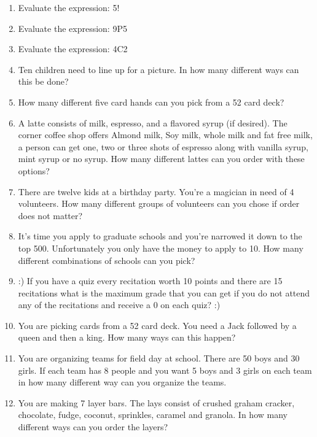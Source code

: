 \documentclass[12pt]{article}
\begin{document}
\begin{enumerate}

\item Evaluate the expression:  5!

\item Evaluate the expression: 9P5

\item Evaluate the expression: 4C2

\item Ten children need to line up for a picture. In how many different ways can this be done?

\item How many different five card hands can you pick from a 52 card deck?

\item A latte consists of milk, espresso, and a flavored syrup (if desired). The corner coffee shop offers Almond milk, Soy milk, whole milk and fat free milk, a person can get one, two or three shots of espresso along with vanilla syrup, mint syrup or no syrup. How many different lattes can you order with these options?

\item There are twelve kids at a birthday party. You're a magician in need of 4 volunteers. How many different groups of volunteers can you chose if order does not matter?

\item It's time you apply to graduate schools and you're narrowed it down to the top 500. Unfortunately you only have the money to apply to 10. How many different combinations of schools can you pick?

\item  :) If you have a quiz every recitation worth 10 points and there are 15 recitations what is the maximum grade that you can get if you do not attend any of the recitations and receive a 0 on each quiz? :) 

\item You are picking cards from a 52 card deck. You need a Jack followed by a queen and then a king. How many ways can this happen?

\item You are organizing teams for field day at school. There are 50 boys and 30 girls. If each team has 8 people and you want 5 boys and 3 girls on each team in how many different way can you organize the teams. 

\item  You are making 7 layer bars. The lays consist of crushed graham cracker, chocolate, fudge, coconut, sprinkles, caramel and granola. In how many different ways can you order the layers?


\end{enumerate}
\end{document}
